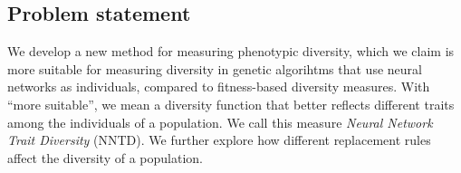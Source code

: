 \subsection{Problem statement}
\label{sec:problemstatement}


We develop a new method for measuring phenotypic diversity, which we claim is more suitable for measuring diversity in genetic algorihtms that use neural networks as individuals, compared to fitness-based diversity measures. With ``more suitable'', we mean a diversity function that better reflects different traits among the individuals of a population. We call this measure \emph{Neural Network Trait Diversity} (NNTD). We further explore how different replacement rules affect the diversity of a population. 
